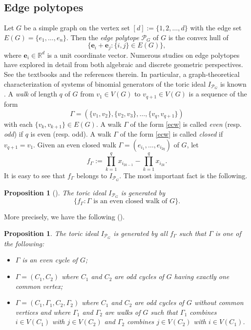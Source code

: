 \documentclass[10pt,a4paper]{amsart}
\newtheorem{prop}[thm]{Proposition}
\numberwithin{thm}{section}
\numberwithin{equation}{section}
\def\epoly{{\mathcal P}_G}
\def\NZQ{\mathbb}               %
\def\RR{{\NZQ R}}
\def\eb{{\mathbf e}}
\begin{document}
\subsection{Edge polytopes}

Let $G$ be a simple graph on the vertex set $[d]:= \{1,2,\dots,d\}$
with the edge set $E(G)=\{e_1,\dots, e_n \}$.
Then the {\em edge polytope} $\epoly$ of $G$ is the convex hull of
\[
\{
\eb_i + \eb_j : \{i,j\} \in E(G)
\},
\]
where $\eb_i \in \RR^d$ is a unit coordinate vector.
Numerous studies on edge polytopes have explored in detail
 from both algebraic and discrete geometric perspectives.
See the textbooks \cite{HHO, V} and the references therein.
In particular, a graph-theoretical characterization of systems of binomial generators of the toric ideal $I_{\epoly}$ is known \cite{Vecw}.
A {\it walk} of length $q$ of $G$ from $v_1 \in V(G)$ to $v_{q+1} \in V(G)$ is a sequence of the form 
\begin{equation} \label{ecw}
    \Gamma =(\{v_1,v_2\}, \{v_2,v_3\}, \dots,\{v_q,v_{q+1}\})
\end{equation}
with each $\{v_k,v_{k+1} \} \in E(G)$.
A walk $\Gamma$ of the form \eqref{ecw} is called {\it even} (resp. {\it odd}) if $q$ is even  (resp. odd).
A walk $\Gamma$ of the form \eqref{ecw} is called 
{\it closed} if $v_{q+1} = v_1$.
Given an even closed walk $    \Gamma =(e_{i_1}, \dots, e_{i_{2q}})$ of $G$, let
   $$
    f_\Gamma := \prod_{k=1}^q x_{i_{2k-1}} - \prod_{k=1}^q x_{i_{2k}}
    .$$
It is easy to see that $f_\Gamma$ belongs to $I_{\epoly}$.
The most important fact is the following.

\begin{prop}[{\cite[Proposition 3.1]{Vecw}}]
    The toric ideal $I_{\epoly}$ is generated by 
    $$\{ f_\Gamma : \Gamma \mbox{ is an even closed walk of }G \}.$$
\end{prop}

More precisely, we have the following (\cite[Lemmas 5.10 and 5.11]{HHO}).

\begin{prop}\label{edge gene}
    The toric ideal $I_{\epoly}$ is generated by all $f_\Gamma$ such that $\Gamma$ is one of the following{\rm :}
    \begin{itemize}
        \item[(i)]
        $\Gamma$ is an even cycle of $G${\rm ;}
        \item[(ii)]
        $\Gamma=(C_1,C_2)$ where $C_1$ and $C_2$ are odd cycles of $G$ having exactly one common vertex{\rm ;}
        \item[(iii)]
        $\Gamma=(C_1,\Gamma_1,C_2,\Gamma_2)$ where $C_1$ and $C_2$ are odd cycles of $G$ without common vertices and where $\Gamma_1$ and $\Gamma_2$ are walks of $G$ such that $\Gamma_1$ combines $i \in V(C_1)$ with $j \in V(C_2)$
        and $\Gamma_2$ combines $j \in V(C_2)$ with $i \in V(C_1)$. 
    \end{itemize}


\end{prop}
\end{document}
